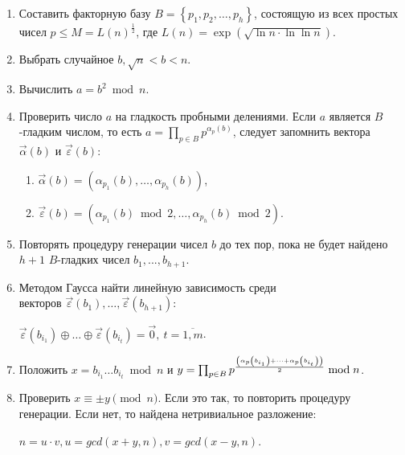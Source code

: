 \documentclass[bachelor, och, labwork]{shiza}
\begin{document}
\begin{enumerate}
    \item Составить факторную базу $B = \left\{ {p_1,p_2,\dots,p_h} \right\}$, 
    состоящую из всех простых чисел $p \leq M = L\left({n}\right)^\frac{1}{2}$, 
    где $L\left({n}\right)=\exp\left({\sqrt{\ln{n}\cdot \ln{\ln{n}}}}\right)$.
    \item Выбрать случайное $b, \sqrt{n}<b<n$.
    \item Вычислить $a = b^2\bmod{n}$.
    \item Проверить число $a$ на гладкость пробными делениями. Если $a$ является
    $B$-гладким числом, то есть $a = \prod_{p\in B}p^{\alpha_{p}\left({b}\right)}$,
    следует запомнить вектора $\vec{\alpha}\left({b}\right)$ и $\vec{\varepsilon}\left({b}\right)$:
        \begin{enumerate}
            \item $\vec{\alpha}\left({b}\right)=\left({\alpha_{p_1}\left({b}\right), \dots, \alpha_{p_h}\left({b}\right)}\right)$,
            \item $\vec{\varepsilon}\left({b}\right)=\left({\alpha_{p_1}\left({b}\right)\bmod{2}, \dots, \alpha_{p_h}\left({b}\right)\bmod{2}}\right)$.
        \end{enumerate}
    \item Повторять процедуру генерации чисел $b$ до тех пор, пока не будет 
    найдено $h+1$ $B$-гладких чисел $b_1,...,b_{h+1}$.
    \item Методом Гаусса найти линейную зависимость среди \\векторов
    $\vec{\varepsilon}\left({b_1}\right), \dots, \vec{\varepsilon}\left({b_{h+1}}\right)$:
    \begin{center}
        $\vec{\varepsilon}\left({b_{i_1}}\right)\oplus\dots\oplus\vec{\varepsilon}\left({b_{i_t}}\right)=\vec{0}, ~t=\overline{1,m}$.
    \end{center}
    \item Положить $x=b_{i_1} \dots b_{i_t}\bmod{n}$ и $y=\prod_{p\in B}p^{\left({ \alpha_p\left({b_{i_1}}\right)+\dots+\alpha_p\left({b_{i_t}}\right) }\right) \over{2}}\bmod{n}$.
    \item Проверить $x \equiv \pm y \pmod{n}$. Если это так, то повторить
    процедуру генерации. Если нет, то найдена нетривиальное разложение:
    \begin{center}
        ${\displaystyle n=u\cdot v,u=gcd\left({x+y,n}\right),v=gcd\left({x-y,n}\right).}$
    \end{center}
\end{enumerate}
\end{document}
